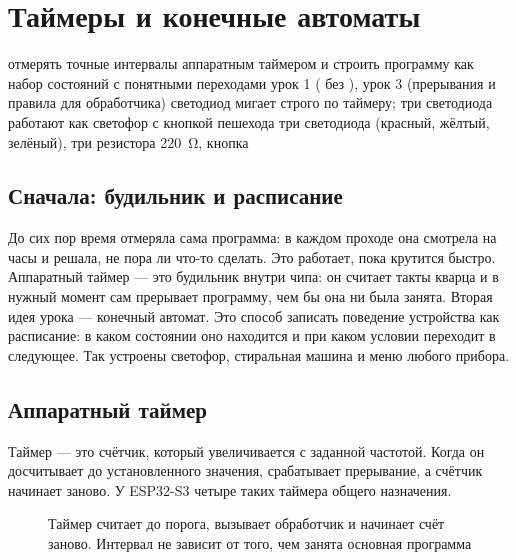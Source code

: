 \section{Таймеры и конечные автоматы}
\lessonintro
  {отмерять точные интервалы аппаратным таймером и строить программу как набор состояний с понятными переходами}
  {урок 1 ( без ), урок 3 (прерывания и правила для обработчика)}
  {светодиод мигает строго по таймеру; три светодиода работают как светофор с кнопкой пешехода}
  {три светодиода (красный, жёлтый, зелёный), три резистора \SI{220}{\ohm}, кнопка}

\subsection{Сначала: будильник и расписание}

До сих пор время отмеряла сама программа: в каждом проходе  она смотрела на часы
 и решала, не пора ли что-то сделать. Это работает, пока  крутится быстро.
Аппаратный таймер --- это будильник внутри чипа: он считает такты кварца и в нужный момент сам прерывает
программу, чем бы она ни была занята. Вторая идея урока --- конечный автомат. Это способ записать
поведение устройства как расписание: в каком состоянии оно находится и при каком условии переходит
в следующее. Так устроены светофор, стиральная машина и меню любого прибора.

\subsection{Аппаратный таймер}

Таймер --- это счётчик, который увеличивается с заданной частотой. Когда он досчитывает до установленного
значения, срабатывает прерывание, а счётчик начинает заново. У ESP32-S3 четыре таких таймера общего
назначения.

\begin{figure}[H]
\centering
{}
\caption{Таймер считает до порога, вызывает обработчик и начинает счёт заново. Интервал не зависит от
того, чем занята основная программа}
\end{figure}

